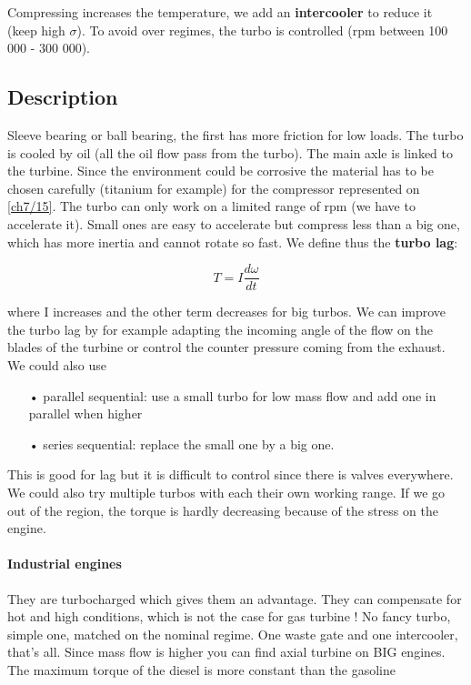 	Compressing increases the temperature, we add an \textbf{intercooler} to reduce it (keep high $\sigma$). To avoid over regimes, the turbo is controlled (rpm between 100 000 - 300 000). 
	
\subsection{Description}
	Sleeve bearing or ball bearing, the first has more friction for low loads. The turbo is cooled by oil (all the oil flow pass from the turbo).  The main axle is linked to the turbine. Since the environment could be corrosive the material has to be chosen carefully (titanium for example) for the compressor represented on \autoref{ch7/15}. The turbo can only work on a limited range of rpm (we have to accelerate it). Small ones are easy to accelerate but compress less than a big one, which has more inertia and cannot rotate so fast. We define thus the \textbf{turbo lag}: 
	
	\begin{equation}
	T = I \frac{d\omega}{dt}
	\end{equation}
	
	where I increases and the other term decreases for big turbos. We can improve the turbo lag by for example adapting the incoming angle of the flow on the blades of the turbine or control the counter pressure coming from the exhaust. We could also use 
	
	\begin{itemize}
	\item[•] parallel sequential: use a small turbo for low mass flow and add one in parallel when higher
	\item[•] series sequential: replace the small one by a big one. \\
	\end{itemize}
	
	This is good for lag but it is difficult to control since there is valves everywhere. We could also try multiple turbos with each their own working range. If we go out of the region, the torque is hardly decreasing because of the stress on the engine. 
	
\paragraph{Industrial engines}
	They are turbocharged which gives them an advantage. They can compensate for hot and high conditions, which is not the case for gas turbine ! No fancy turbo, simple one, matched on the nominal regime. One waste gate and one intercooler, that’s all. Since mass flow is higher you can find axial turbine on BIG engines. The maximum torque of the diesel is more constant than the gasoline
	
